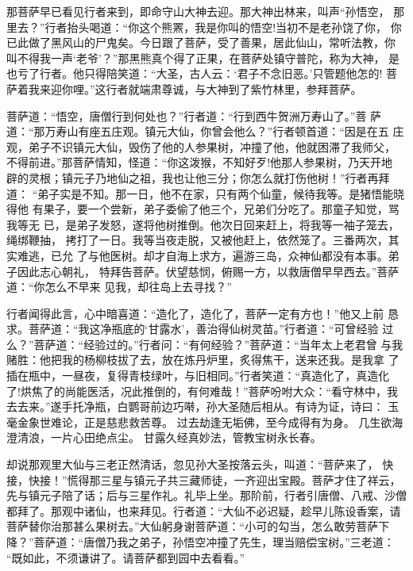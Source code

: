 那菩萨早已看见行者来到，即命守山大神去迎。那大神出林来，叫声“孙悟空，
那里去？”行者抬头喝道：“你这个熊罴，我是你叫的悟空!当初不是老孙饶了你，
你已此做了黑风山的尸鬼矣。今日跟了菩萨，受了善果，居此仙山，常听法教，你
叫不得我一声‘老爷’？”那黑熊真个得了正果，在菩萨处镇守普陀，称为大神，
是也亏了行者。他只得陪笑道：“大圣，古人云：‘君子不念旧恶。’只管题他怎的!
菩萨着我来迎你哩。”这行者就端肃尊诚，与大神到了紫竹林里，参拜菩萨。

菩萨道：“悟空，唐僧行到何处也？”行者道：“行到西牛贺洲万寿山了。”菩
萨道：“那万寿山有座五庄观。镇元大仙，你曾会他么？”行者顿首道：“因是在五
庄观，弟子不识镇元大仙，毁伤了他的人参果树，冲撞了他，他就困滞了我师父，
不得前进。”那菩萨情知，怪道：“你这泼猴，不知好歹!他那人参果树，乃天开地
辟的灵根；镇元子乃地仙之祖，我也让他三分；你怎么就打伤他树！”行者再拜道：
“弟子实是不知。那一日，他不在家，只有两个仙童，候待我等。是猪悟能晓得他
有果子，要一个尝新，弟子委偷了他三个，兄弟们分吃了。那童子知觉，骂我等无
已，是弟子发怒，遂将他树推倒。他次日回来赶上，将我等一袖子笼去，绳绑鞭抽，
拷打了一日。我等当夜走脱，又被他赶上，依然笼了。三番两次，其实难逃，已允
了与他医树。却才自海上求方，遍游三岛，众神仙都没有本事。弟子因此志心朝礼，
特拜告菩萨。伏望慈悯，俯赐一方，以救唐僧早早西去。”菩萨道：“你怎么不早来
见我，却往岛上去寻找？”

行者闻得此言，心中暗喜道：“造化了，造化了，菩萨一定有方也！”他又上前
恳求。菩萨道：“我这净瓶底的‘甘露水’，善治得仙树灵苗。”行者道：“可曾经验
过么？”菩萨道：“经验过的。”行者问：“有何经验？”菩萨道：“当年太上老君曾
与我赌胜：他把我的杨柳枝拔了去，放在炼丹炉里，炙得焦干，送来还我。是我拿
了插在瓶中，一昼夜，复得青枝绿叶，与旧相同。”行者笑道：“真造化了，真造化
了!烘焦了的尚能医活，况此推倒的，有何难哉！”菩萨吩咐大众：“看守林中，我
去去来。”遂手托净瓶，白鹦哥前边巧啭，孙大圣随后相从。有诗为证，诗曰：
玉毫金象世难论，正是慈悲救苦尊。
过去劫逢无垢佛，至今成得有为身。
几生欲海澄清浪，一片心田绝点尘。
甘露久经真妙法，管教宝树永长春。

却说那观里大仙与三老正然清话，忽见孙大圣按落云头，叫道：“菩萨来了，
快接，快接！”慌得那三星与镇元子共三藏师徒，一齐迎出宝殿。菩萨才住了祥云，
先与镇元子陪了话；后与三星作礼。礼毕上坐。那阶前，行者引唐僧、八戒、沙僧
都拜了。那观中诸仙，也来拜见。行者道：“大仙不必迟疑，趁早儿陈设香案，请
菩萨替你治那甚么果树去。”大仙躬身谢菩萨道：“小可的勾当，怎么敢劳菩萨下
降？”菩萨道：“唐僧乃我之弟子，孙悟空冲撞了先生，理当赔偿宝树。”三老道：
“既如此，不须谦讲了。请菩萨都到园中去看看。”

